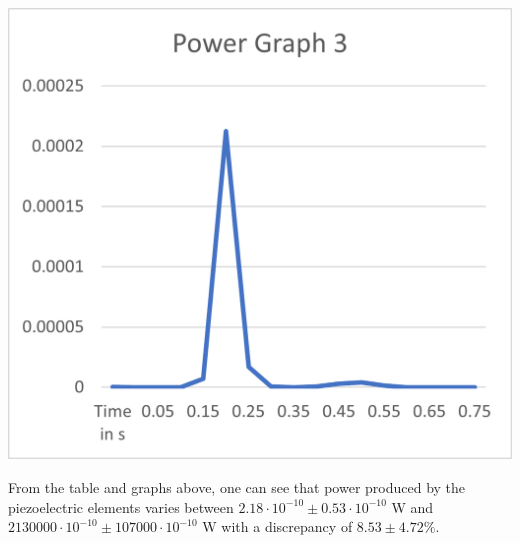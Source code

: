 \begin{minipage}{0.5\textwidth}
    \includegraphics[width=\textwidth]{./Figure_16.png}
    \label{fig:Power Graph 3}
\end{minipage}

\vspace{0.5cm}

From the table and graphs above, one can see that power produced by the piezoelectric elements varies between $2.18 \cdot 10^{-10} \pm 0.53 \cdot 10^{-10}$ W and $2130000 \cdot 10^{-10} \pm 107000 \cdot 10^{-10}$ W with a discrepancy of $8.53 \pm 4.72\%$.
